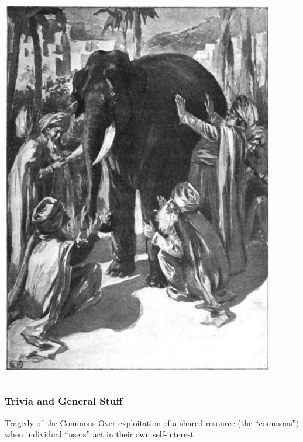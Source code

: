 \documentclass[10pt]{beamer}
\begin{document}
\begin{frame}[t]
\begin{columns}
		\begin{column}{0.4\textwidth}
			\begin{center}
				\includegraphics[width=0.9\textwidth]{figures/blind.jpg}
			\end{center}
		\end{column}
	\end{columns}
	
\end{frame}


\begin{frame}[t]
\frametitle{Trivia and General Stuff}
\vspace{0.5cm}
	
	\begin{center}
		\begin{block}{Tragedy of the Commons}	
			Over-exploitation of a shared resource (the ``commons'') when individual ``users'' act in their own self-interest
		\end{block}
	\end{center}
\end{frame}
\end{document}
